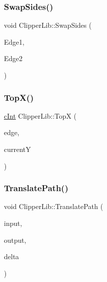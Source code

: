 \mbox{\label{namespace_clipper_lib_a63ceaffceda5d8e57ef98a0d7317b342}} 
\subsubsection{\texorpdfstring{SwapSides()}{SwapSides()}}
{\footnotesize\ttfamily void Clipper\+Lib\+::\+Swap\+Sides (\begin{DoxyParamCaption}\item[{\mbox{\hyperlink{struct_clipper_lib_1_1_t_edge}{T\+Edge}} \&}]{Edge1,  }\item[{\mbox{\hyperlink{struct_clipper_lib_1_1_t_edge}{T\+Edge}} \&}]{Edge2 }\end{DoxyParamCaption})\hspace{0.3cm}{\ttfamily [inline]}}

\mbox{\label{namespace_clipper_lib_a63e0b77cf7232cbd4f9909b25bd300be}} 
\subsubsection{\texorpdfstring{TopX()}{TopX()}}
{\footnotesize\ttfamily \mbox{\hyperlink{namespace_clipper_lib_a7156730a24951629192d4831334bafaa}{c\+Int}} Clipper\+Lib\+::\+TopX (\begin{DoxyParamCaption}\item[{\mbox{\hyperlink{struct_clipper_lib_1_1_t_edge}{T\+Edge}} \&}]{edge,  }\item[{const \mbox{\hyperlink{namespace_clipper_lib_a7156730a24951629192d4831334bafaa}{c\+Int}}}]{currentY }\end{DoxyParamCaption})\hspace{0.3cm}{\ttfamily [inline]}}

\mbox{\label{namespace_clipper_lib_a3fd004390023c8780f3b60e728d8ab8f}} 
\subsubsection{\texorpdfstring{TranslatePath()}{TranslatePath()}}
{\footnotesize\ttfamily void Clipper\+Lib\+::\+Translate\+Path (\begin{DoxyParamCaption}\item[{const \mbox{\hyperlink{namespace_clipper_lib_af39c8fe00f278f18cc8142fef41242da}{Path}} \&}]{input,  }\item[{\mbox{\hyperlink{namespace_clipper_lib_af39c8fe00f278f18cc8142fef41242da}{Path}} \&}]{output,  }\item[{const \mbox{\hyperlink{struct_clipper_lib_1_1_int_point}{Int\+Point}}}]{delta }\end{DoxyParamCaption})}

